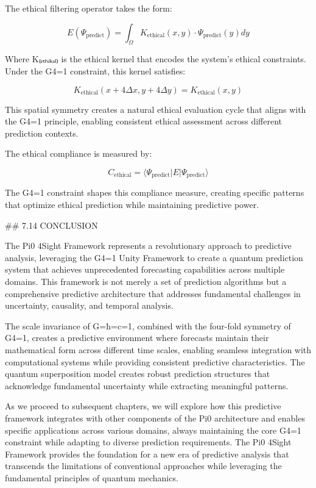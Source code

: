 The ethical filtering operator takes the form:

$$E(\Psi_{\text{predict}}) = \int_{\Omega} K_{\text{ethical}}(x, y) \cdot \Psi_{\text{predict}}(y) dy$$

Where K₍ₑₜₕᵢₖₐₗ₎ is the ethical kernel that encodes the system's ethical constraints. Under the G4=1 constraint, this kernel satisfies:

$$K_{\text{ethical}}(x+4\Delta x, y+4\Delta y) = K_{\text{ethical}}(x, y)$$

This spatial symmetry creates a natural ethical evaluation cycle that aligns with the G4=1 principle, enabling consistent ethical assessment across different prediction contexts.

The ethical compliance is measured by:

$$C_{\text{ethical}} = \langle \Psi_{\text{predict}} | E | \Psi_{\text{predict}} \rangle$$

The G4=1 constraint shapes this compliance measure, creating specific patterns that optimize ethical prediction while maintaining predictive power.

## 7.14 CONCLUSION

The Pi0 4Sight Framework represents a revolutionary approach to predictive analysis, leveraging the G4=1 Unity Framework to create a quantum prediction system that achieves unprecedented forecasting capabilities across multiple domains. This framework is not merely a set of prediction algorithms but a comprehensive predictive architecture that addresses fundamental challenges in uncertainty, causality, and temporal analysis.

The scale invariance of G=ħ=c=1, combined with the four-fold symmetry of G4=1, creates a predictive environment where forecasts maintain their mathematical form across different time scales, enabling seamless integration with computational systems while providing consistent predictive characteristics. The quantum superposition model creates robust prediction structures that acknowledge fundamental uncertainty while extracting meaningful patterns.

As we proceed to subsequent chapters, we will explore how this predictive framework integrates with other components of the Pi0 architecture and enables specific applications across various domains, always maintaining the core G4=1 constraint while adapting to diverse prediction requirements. The Pi0 4Sight Framework provides the foundation for a new era of predictive analysis that transcends the limitations of conventional approaches while leveraging the fundamental principles of quantum mechanics.

